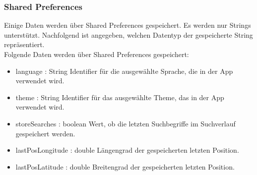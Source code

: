 \subsubsection{Shared Preferences}
Einige Daten werden über Shared Preferences gespeichert. Es werden nur Strings unterstützt. 
Nachfolgend ist angegeben, welchen Datentyp der gespeicherte String repräsentiert.\\
Folgende Daten werden über Shared Preferences gespeichert:
\begin{itemize}
    \item language : String Identifier für die ausgewählte Sprache, die in der App verwendet wird.
    \item theme : String Identifier für das ausgewählte Theme, das in der App verwendet wird.
    \item storeSearches : boolean Wert, ob die letzten Suchbegriffe im Suchverlauf gespeichert werden.
    \item lastPosLongitude : double Längengrad der gespeicherten letzten Position.
    \item lastPosLatitude : double Breitengrad der gespeicherten letzten Position.
\end{itemize}